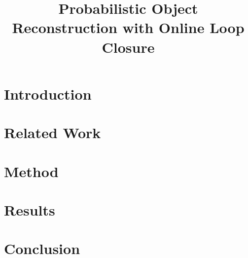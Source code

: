 \documentclass{bmvc2k}
\title{Probabilistic Object Reconstruction with Online Loop Closure}
\begin{document}
\maketitle

\begin{abstract}

\end{abstract}

\vspace{-\baselineskip}

\section{Introduction}
\label{sec:introduction}


\vspace{-\baselineskip}

\section{Related Work}
\label{sec:lit_review}


\vspace{-\baselineskip}

\section{Method}



\section{Results}
\label{sec:results}


\vspace{-\baselineskip}

\section{Conclusion}
\label{sec:discussion}



\end{document}
